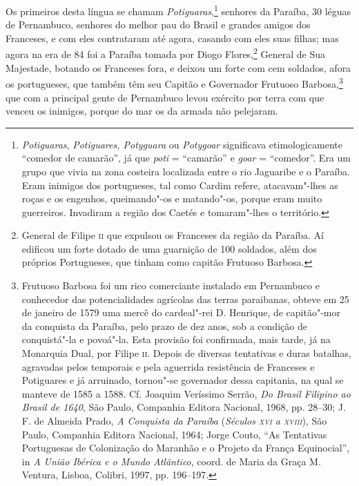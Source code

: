 \begin{linenumbers}
 Os primeiros desta língua se chamam \textit{Potiguaras},\footnote{ \textit{Potiguaras}, 
\textit{Potiguares, Potyguara} ou \textit{Potygoar} 
significava etimologicamente ``comedor de camarão'', já
que \textit{poti} = ``camarão'' e \textit{goar} = ``comedor''. Era um grupo
que vivia na zona costeira localizada entre o rio Jaguaribe e o
Paraíba. Eram inimigos dos portugueses, tal como Cardim refere,
atacavam"-lhes as roças e os engenhos, queimando"-os e matando"-os, porque
eram muito guerreiros. Invadiram a região dos Caetés e tomaram"-lhes o
território.} senhores da Paraíba, 30 léguas de Pernambuco,
senhores do melhor pau do Brasil e grandes amigos dos Franceses, e com
eles contrataram até agora, casando com eles suas filhas; mas agora na
era de 84 foi a Paraíba tomada por Diogo Flores,\footnote{ General 
de Filipe \textsc{ii} que expulsou os Franceses da região da Paraíba. Aí
edificou um forte dotado de uma guarnição de 100 soldados, além dos
próprios Portugueses, que tinham como capitão Frutuoso Barbosa.} 
General de Sua Majestade, botando os Franceses fora, e deixou um forte
com cem soldados, afora os portugueses, que também têm seu Capitão e
Governador Frutuoso Barbosa,\footnote{ Frutuoso Barbosa foi um rico
comerciante instalado em Pernambuco e conhecedor das potencialidades
agrícolas das terras paraibanas, obteve em 25 de janeiro de 1579 uma
mercê do cardeal"-rei D. Henrique, de capitão"-mor da conquista da
Paraíba, pelo prazo de dez anos, sob a condição de conquistá"-la e
povoá"-la. Esta provisão foi confirmada, mais tarde, já na Monarquia
Dual, por Filipe \textsc{ii}. Depois de diversas tentativas e duras batalhas,
agravadas pelos temporais e pela aguerrida resistência de Franceses e
Potiguares e já arruinado, tornou"-se governador dessa capitania, na
qual se manteve de 1585 a 1588. Cf. Joaquim Veríssimo Serrão,
\textit{Do Brasil Filipino ao Brasil de 1640}, São Paulo, Companhia
Editora Nacional, 1968, pp. 28--30; J. F. de Almeida Prado, \textit{A
Conquista da Paraíba} (\textit{Séculos \textsc{xvi} a \textsc{xviii}}), São Paulo, Companhia
Editora Nacional, 1964; Jorge Couto, ``As Tentativas Portuguesas de
Colonização do Maranhão e o Projeto da França Equinocial'', in
\textit{A União Ibérica e o Mundo Atlântico}, coord. de Maria da Graça
M. Ventura, Lisboa, Colibri, 1997, pp. 196--197.} que com a principal
gente de Pernambuco levou exército por terra com que venceu os
inimigos, porque do mar os da armada não pelejaram. 


\end{linenumbers}
